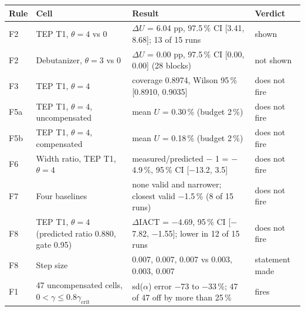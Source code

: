 \begin{tabular}{@{}llll@{}}
\toprule
Rule & Cell & Result & Verdict \\
\midrule
F2 & TEP T1, $\theta=4$ vs 0 & $\Delta U$ = 6.04 pp, 97.5\,\% CI [3.41, 8.68]; 13 of 15 runs & shown \\
F2 & Debutanizer, $\theta=3$ vs 0 & $\Delta U$ = 0.00 pp, 97.5\,\% CI [0.00, 0.00] (28 blocks) & not shown \\
F3 & TEP T1, $\theta=4$ & coverage 0.8974, Wilson 95\,\% [0.8910, 0.9035] & does not fire \\
F5a & TEP T1, $\theta=4$, uncompensated & mean $U$ = 0.30\,\% (budget 2\,\%) & does not fire \\
F5b & TEP T1, $\theta=4$, compensated & mean $U$ = 0.18\,\% (budget 2\,\%) & does not fire \\
F6 & Width ratio, TEP T1, $\theta=4$ & measured/predicted $-$ 1 = $-$4.9\,\%, 95\,\% CI [$-$13.2, 3.5] & does not fire \\
F7 & Four baselines & none valid and narrower; closest valid $-$1.5\,\% (8 of 15 runs) & does not fire \\
F8 & TEP T1, $\theta=4$ (predicted ratio 0.880, gate 0.95) & $\Delta$IACT = $-$4.69, 95\,\% CI [$-$7.82, $-$1.55]; lower in 12 of 15 runs & does not fire \\
F8 & Step size & 0.007, 0.007, 0.007 vs 0.003, 0.003, 0.007 & statement made \\
F1 & 47 uncompensated cells, $0 < \gamma \le 0.8\gamma_{\mathrm{crit}}$ & sd($\alpha$) error $-$73 to $-$33\,\%; 47 of 47 off by more than 25\,\% & fires \\
\bottomrule
\end{tabular}
